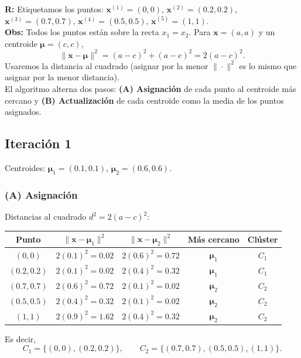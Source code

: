 \textbf{R:} Etiquetamos los puntos: $\mathbf{x}^{(1)} = (0,0)$, $\mathbf{x}^{(2)} = (0.2, 0.2)$, $\mathbf{x}^{(3)} = (0.7, 0.7)$, $\mathbf{x}^{(4)} = (0.5, 0.5)$, $\mathbf{x}^{(5)} = (1, 1)$.\\

\textbf{Obs:} Todos los puntos están sobre la recta $x_1 = x_2$. Para $\mathbf{x} = (a, a)$ y un centroide $\boldsymbol{\mu} = (c, c)$,
\[
    \| \mathbf{x} - \boldsymbol{\mu} \|^2 = (a-c)^2 + (a-c)^2 = 2 (a-c)^2.
\]
Usaremos la distancia al cuadrado (asignar por la menor $\|\cdot\|^2$ es lo mismo que asignar por la menor distancia).\\

El algoritmo alterna dos pasos: \textbf{(A) Asignación} de cada punto al centroide más cercano y \textbf{(B) Actualización} de cada centroide como la media de los puntos asignados.

\subsection*{Iteración 1}
Centroides: $\boldsymbol{\mu}_1 = (0.1, 0.1)$, $\boldsymbol{\mu}_2 = (0.6, 0.6)$.

\subsubsection*{(A) Asignación}
Distancias al cuadrado $d^2 = 2(a-c)^2$:
\begin{center}
    \begin{tabular}{ccccc}
        \toprule
        Punto & $\| \mathbf{x} - \boldsymbol{\mu}_1 \|^2$ & $\| \mathbf{x} - \boldsymbol{\mu}_2 \|^2$ & Más cercano & Clúster \\
        \midrule
        $(0, 0)$     & $2(0.1)^2 = 0.02$ & $2(0.6)^2 = 0.72$ & $\boldsymbol{\mu}_1$ & $C_1$ \\
        $(0.2, 0.2)$ & $2(0.1)^2 = 0.02$ & $2(0.4)^2 = 0.32$ & $\boldsymbol{\mu}_1$ & $C_1$ \\
        $(0.7, 0.7)$ & $2(0.6)^2 = 0.72$ & $2(0.1)^2 = 0.02$ & $\boldsymbol{\mu}_2$ & $C_2$ \\
        $(0.5, 0.5)$ & $2(0.4)^2 = 0.32$ & $2(0.1)^2 = 0.02$ & $\boldsymbol{\mu}_2$ & $C_2$ \\
        $(1, 1)$     & $2(0.9)^2 = 1.62$ & $2(0.4)^2 = 0.32$ & $\boldsymbol{\mu}_2$ & $C_2$ \\
        \bottomrule
    \end{tabular}
\end{center}
Es decir,
\[
    C_1 = \{(0, 0), (0.2, 0.2)\}, \qquad C_2 = \{(0.7, 0.7), (0.5, 0.5), (1, 1)\}.
\]

